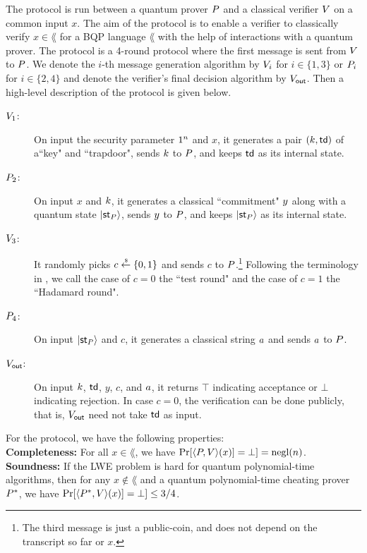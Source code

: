 The protocol is run between a quantum prover $P$ and a classical verifier $V$ on a common input $x$. The aim of the protocol is to enable a verifier to classically verify $x\in \lang$ for a BQP language $\lang$ with the help of interactions with a quantum prover.
The protocol is a 4-round protocol where the first message is sent from $V$ to $P$. 
We denote the $i$-th message generation algorithm by $V_i$ for $i\in\{1,3\}$ or $P_i$ for $i\in \{2,4\}$ and denote the verifier's final decision algorithm by $V_{\mathsf{out}}$.
Then a high-level description of the protocol is given below.
\begin{description}
\item[$V_1$:] On input the security parameter $1^n$ and $x$, it generates a pair $(k,\mathsf{td})$ of a``key" and ``trapdoor", sends $k$ to $P$, and keeps $\mathsf{td}$ as its internal state.
\item[$P_2$:] On input $x$ and $k$, it generates a classical ``commitment" $y$ along with a quantum state $\ket{\mathsf{st}_P}$, sends $y$ to $P$, and keeps $\ket{\mathsf{st}_P}$ as its internal state.
\item[$V_3$:] It randomly picks $c\overset{\hspace{0.1em}\mathsf{\scriptscriptstyle\$}}{\leftarrow} \{0,1\}$ and sends $c$ to $P$.\footnote{The third message is just a public-coin, and does not depend on the transcript so far or $x$.}
Following the terminology in \cite{FOCS:Mahadev18a}, we call the case of $c=0$ the ``test round" and the case of $c=1$ the ``Hadamard round".
\item[$P_4$:] On input $\ket{\mathsf{st}_P}$ and $c$, it generates a classical string $a$ and sends $a$ to $P$.
\item[$V_{\mathsf{out}}$:] On input $k$, $\mathsf{td}$, $y$, $c$, and $a$, it returns $\top$ indicating acceptance or $\bot$ indicating rejection.
In case $c=0$, the verification can be done publicly, that is, $V_{\mathsf{out}}$ need not take $\mathsf{td}$ as input.
\end{description}

For the protocol, we have the following properties:\\
\noindent\textbf{Completeness:}
For all $x\in \lang$, we have $\Pr[\langle P,V \rangle(x)]=\bot]= \operatorname{negl}(n)$.\\
\noindent\textbf{Soundness:}
If the LWE problem is hard for quantum polynomial-time algorithms, then for any $x\notin \lang$ and a quantum polynomial-time cheating prover $P^*$, we have  $\Pr[\langle P^*,V \rangle(x)]=\bot]\leq 3/4$.

